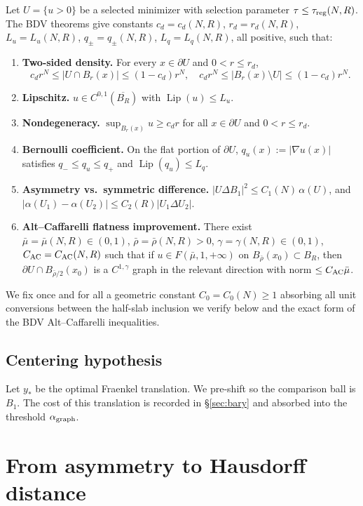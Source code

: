 \documentclass[11pt]{article}
\theoremstyle{definition}
\theoremstyle{remark}
\newcommand{\BB}{B_1}
\DeclareMathOperator{\Lip}{Lip}
\begin{document}
Let $U=\{u>0\}$ be a selected minimizer with selection parameter
$\tau\le\tau_{\rm reg}(N,R)$. The BDV theorems give constants
$c_d=c_d(N,R)$, $r_d=r_d(N,R)$, $L_u=L_u(N,R)$, $q_\pm=q_\pm(N,R)$,
$L_q=L_q(N,R)$, all positive, such that:

\begin{enumerate}
\item[\rm(L4.9)] \textbf{Two-sided density.} For every $x\in\partial U$
and $0<r\le r_d$,
\[
c_d r^N\le|U\cap B_r(x)|\le(1-c_d)r^N,\quad
c_d r^N\le|B_r(x)\setminus U|\le(1-c_d)r^N.
\]
\item[\rm(L4.12a)] \textbf{Lipschitz.}
$u\in C^{0,1}(\overline{B_R})$ with $\Lip(u)\le L_u$.
\item[\rm(L4.12b)] \textbf{Nondegeneracy.}
$\sup_{B_r(x)}u\ge c_d r$ for all $x\in\partial U$ and $0<r\le r_d$.
\item[\rm(L4.16)] \textbf{Bernoulli coefficient.} On the flat portion
of $\partial U$, $q_u(x):=|\nabla u(x)|$ satisfies $q_-\le q_u\le q_+$
and $\Lip(q_u)\le L_q$.
\item[\rm(L4.2)] \textbf{Asymmetry vs.\ symmetric difference.}
$|U\Delta\BB|^2\le C_1(N)\,\alpha(U)$, and
$|\alpha(U_1)-\alpha(U_2)|\le C_2(R)|U_1\Delta U_2|$.
\item[\rm(T4.18)] \textbf{Alt--Caffarelli flatness improvement.} There exist
$\bar\mu=\bar\mu(N,R)\in(0,1)$, $\bar\rho=\bar\rho(N,R)>0$,
$\gamma=\gamma(N,R)\in(0,1)$, $C_{\rm AC}=C_{\rm AC}(N,R)$ such that if
$u\in F(\bar\mu,1,+\infty)$ on $B_{\bar\rho}(x_0)\subset B_R$, then
$\partial U\cap B_{\bar\rho/2}(x_0)$ is a $C^{1,\gamma}$ graph in the
relevant direction with norm $\le C_{\rm AC}\bar\mu$.
\end{enumerate}

We fix once and for all a geometric constant $C_0=C_0(N)\ge1$ absorbing all
unit conversions between the half-slab inclusion we verify below and the
exact form of the BDV Alt--Caffarelli inequalities.

\subsection{Centering hypothesis}\label{ssec:center}

Let $y_*$ be the optimal Fraenkel translation. We pre-shift so the
comparison ball is $\BB$. The cost of this translation is recorded in
\S\ref{sec:bary} and absorbed into the threshold $\alpha_{\rm graph}$.

\section{From asymmetry to Hausdorff distance}\label{sec:alphaH}
\end{document}
